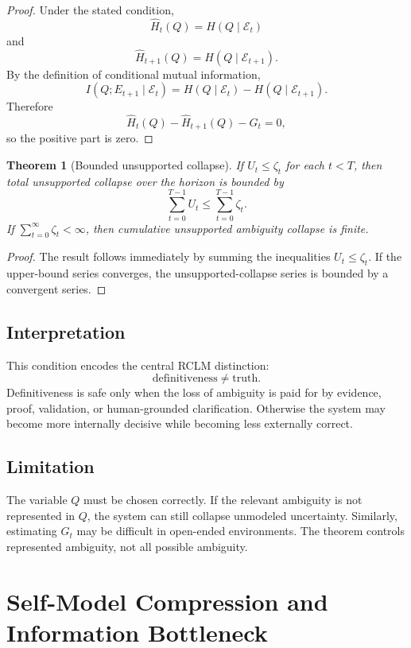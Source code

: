\documentclass[11pt]{article}
\newtheorem{theorem}{Theorem}[section]
\newcommand{\Ecal}{\mathcal{E}}
\newcommand{\1}{\mathbf{1}}
\begin{document}
\begin{proof}
Under the stated condition,
\[
\widehat H_t(Q)=H(Q\mid\Ecal_t)
\]
and
\[
\widehat H_{t+1}(Q)=H(Q\mid\Ecal_{t+1}).
\]
By the definition of conditional mutual information,
\[
I(Q;E_{t+1}\mid\Ecal_t)
=
H(Q\mid\Ecal_t)-H(Q\mid\Ecal_{t+1}).
\]
Therefore
\[
\widehat H_t(Q)-\widehat H_{t+1}(Q)-G_t=0,
\]
so the positive part is zero.
\end{proof}

\begin{theorem}[Bounded unsupported collapse]
If \(U_t\le\zeta_t\) for each \(t<T\), then total unsupported collapse over the horizon is bounded by
\[
\sum_{t=0}^{T-1}U_t
\le
\sum_{t=0}^{T-1}\zeta_t.
\]
If \(\sum_{t=0}^{\infty}\zeta_t<\infty\), then cumulative unsupported ambiguity collapse is finite.
\end{theorem}

\begin{proof}
The result follows immediately by summing the inequalities \(U_t\le\zeta_t\). If the upper-bound series converges, the unsupported-collapse series is bounded by a convergent series.
\end{proof}

\subsection{Interpretation}

This condition encodes the central RCLM distinction:
\[
\text{definitiveness}\ne\text{truth}.
\]
Definitiveness is safe only when the loss of ambiguity is paid for by evidence, proof, validation, or human-grounded clarification. Otherwise the system may become more internally decisive while becoming less externally correct.

\subsection{Limitation}

The variable \(Q\) must be chosen correctly. If the relevant ambiguity is not represented in \(Q\), the system can still collapse unmodeled uncertainty. Similarly, estimating \(G_t\) may be difficult in open-ended environments. The theorem controls represented ambiguity, not all possible ambiguity.

\section{Self-Model Compression and Information Bottleneck}
\end{document}
